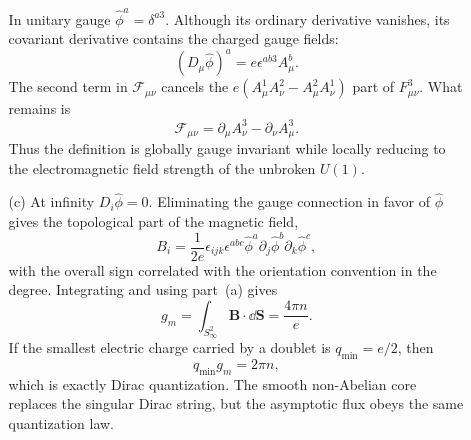 \begin{enumerate}
\begin{enumerate}
    In unitary gauge \(\widehat\phi^a=\delta^{a3}\).  Although its ordinary
    derivative vanishes, its covariant derivative contains the charged
    gauge fields:
    \[
      (D_\mu\widehat\phi)^a
        =e\epsilon^{ab3}A_\mu^b.
    \]
    The second term in \(\mathcal F_{\mu\nu}\) cancels the
    \(e(A_\mu^1A_\nu^2-A_\mu^2A_\nu^1)\) part of \(F_{\mu\nu}^3\).
    What remains is
    \[
      \boxed{\mathcal F_{\mu\nu}
        =\partial_\mu A_\nu^3-\partial_\nu A_\mu^3.}
    \]
    Thus the definition is globally gauge invariant while locally
    reducing to the electromagnetic field strength of the unbroken
    \(U(1)\).
    \item[(c)]
    At infinity \(D_i\widehat\phi=0\).  Eliminating the gauge connection
    in favor of \(\widehat\phi\) gives the topological part of the
    magnetic field,
    \[
      B_i=\frac1{2e}\epsilon_{ijk}\epsilon^{abc}
        \widehat\phi^a\partial_j\widehat\phi^b
        \partial_k\widehat\phi^c,
    \]
    with the overall sign correlated with the orientation convention in
    the degree.  Integrating and using part~(a) gives
    \[
      \boxed{g_m=\int_{S^2_\infty}\mathbf B\cdot \dd\mathbf S
        =\frac{4\pi n}{e}.}
    \]
    If the smallest electric charge carried by a doublet is
    \(q_{\min}=e/2\), then
    \[
      q_{\min}g_m=2\pi n,
    \]
    which is exactly Dirac quantization.  The smooth non-Abelian core
    replaces the singular Dirac string, but the asymptotic flux obeys the
    same quantization law.
  \end{enumerate}


\end{enumerate}
